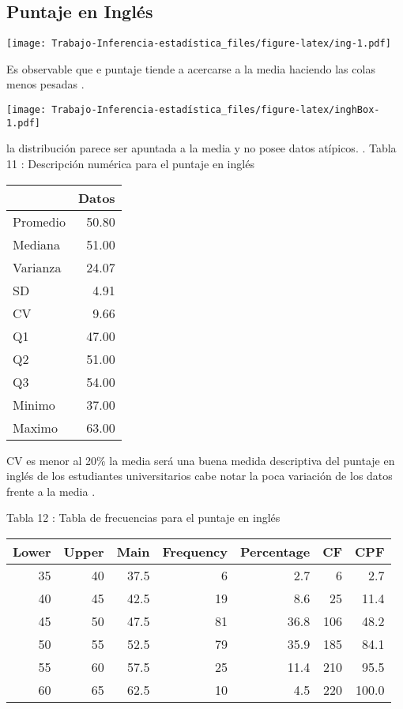 \documentclass[
  man]{apa6}
\begin{document}
\hypertarget{puntaje-en-ingluxe9s}{%
\subsection{Puntaje en Inglés}\label{puntaje-en-ingluxe9s}}

\texttt{[image: Trabajo-Inferencia-estadística\_files/figure-latex/ing-1.pdf]}

Es observable que e puntaje tiende a acercarse a la media haciendo las
colas menos pesadas .

\texttt{[image: Trabajo-Inferencia-estadística\_files/figure-latex/inghBox-1.pdf]}

la distribución parece ser apuntada a la media y no posee datos atípicos.
. \clearpage Tabla 11 : Descripción numérica para el puntaje en inglés

\begin{center}

\begin{tabular}{l|r}
\hline
  & Datos\\
\hline
Promedio & 50.80\\
\hline
Mediana & 51.00\\
\hline
Varianza & 24.07\\
\hline
SD & 4.91\\
\hline
CV & 9.66\\
\hline
Q1 & 47.00\\
\hline
Q2 & 51.00\\
\hline
Q3 & 54.00\\
\hline
Minimo & 37.00\\
\hline
Maximo & 63.00\\
\hline
\end{tabular}
\end{center}

CV es menor al 20\% la media será una buena medida descriptiva del
puntaje en inglés de los estudiantes universitarios cabe notar la poca
variación de los datos frente a la media .

Tabla 12 : Tabla de frecuencias para el puntaje en inglés

\begin{center}


\begin{tabular}{r|r|r|r|r|r|r}
\hline
Lower & Upper & Main & Frequency & Percentage & CF & CPF\\
\hline
35 & 40 & 37.5 & 6 & 2.7 & 6 & 2.7\\
\hline
40 & 45 & 42.5 & 19 & 8.6 & 25 & 11.4\\
\hline
45 & 50 & 47.5 & 81 & 36.8 & 106 & 48.2\\
\hline
50 & 55 & 52.5 & 79 & 35.9 & 185 & 84.1\\
\hline
55 & 60 & 57.5 & 25 & 11.4 & 210 & 95.5\\
\hline
60 & 65 & 62.5 & 10 & 4.5 & 220 & 100.0\\
\hline
\end{tabular}
\end{center}
\end{document}
